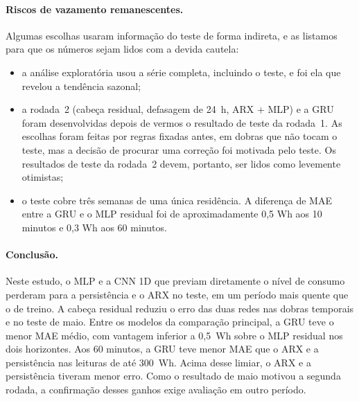 \documentclass[11pt,a4paper]{article}
\begin{document}
\paragraph{Riscos de vazamento remanescentes.} Algumas escolhas usaram informação do teste de forma indireta, e as listamos para que os números sejam lidos com a devida cautela:
\begin{itemize}\setlength\itemsep{0pt}
  \item a análise exploratória usou a série completa, incluindo o teste, e foi ela que revelou a tendência sazonal;
  \item a rodada~2 (cabeça residual, defasagem de 24~h, ARX + MLP) e a GRU foram desenvolvidas depois de vermos o resultado de teste da rodada~1. As escolhas foram feitas por regras fixadas antes, em dobras que não tocam o teste, mas a decisão de procurar uma correção foi motivada pelo teste. Os resultados de teste da rodada~2 devem, portanto, ser lidos como levemente otimistas;
  \item o teste cobre três semanas de uma única residência. A diferença de MAE entre a GRU e o MLP residual foi de aproximadamente 0,5 Wh aos 10 minutos e 0,3 Wh aos 60 minutos.
\end{itemize}

\paragraph{Conclusão.}
Neste estudo, o MLP e a CNN 1D que previam diretamente o nível de consumo perderam para a persistência e o ARX no teste, em um período mais quente que o de treino. A cabeça residual reduziu o erro das duas redes nas dobras temporais e no teste de maio. Entre os modelos da comparação principal, a GRU teve o menor MAE médio, com vantagem inferior a 0,5~Wh sobre o MLP residual nos dois horizontes. Aos 60 minutos, a GRU teve menor MAE que o ARX e a persistência nas leituras de até 300~Wh. Acima desse limiar, o ARX e a persistência tiveram menor erro. Como o resultado de maio motivou a segunda rodada, a confirmação desses ganhos exige avaliação em outro período.



\end{document}
